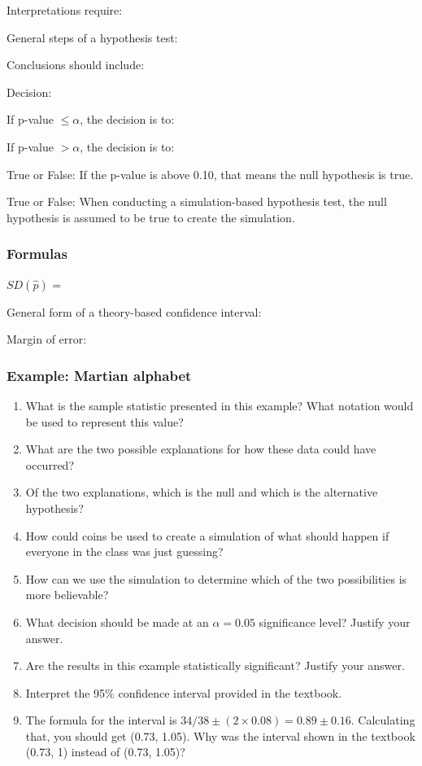 \documentclass[
]{report}
\newcommand{\rgs}{\vspace{12pt}} %
\newcommand{\rgi}{\hspace{24pt}}  %
\begin{document}
\rgi Interpretations require:
\rgs

General steps of a hypothesis test:
\rgs

Conclusions should include:
\rgs

Decision:

\rgi If p-value \(\leq \alpha\), the decision is to:

\rgi If p-value \(> \alpha\), the decision is to:

True or False: If the p-value is above 0.10, that means the null hypothesis is true.

True or False: When conducting a simulation-based hypothesis test, the null hypothesis is assumed to be true to create the simulation.

\hypertarget{formulas}{%
\subsubsection*{Formulas}\label{formulas}}

\(SD(\hat{p})\) =
\rgs

General form of a theory-based confidence interval:
\rgs

Margin of error:
\rgs

\hypertarget{example-martian-alphabet}{%
\subsubsection*{Example: Martian alphabet}\label{example-martian-alphabet}}

\begin{enumerate}
\def\labelenumi{\arabic{enumi}.}
\item
  What is the sample statistic presented in this example? What notation would be used to represent this value?
  \rgs
\item
  What are the two possible explanations for how these data could have occurred?
  \rgs
  \rgs
\item
  Of the two explanations, which is the null and which is the alternative hypothesis?
  \rgs
\item
  How could coins be used to create a simulation of what should happen if everyone in the class was just guessing?
  \rgs
  \rgs
  \rgs
\item
  How can we use the simulation to determine which of the two possibilities is more believable?
  \rgs
  \rgs
\item
  What decision should be made at an \(\alpha = 0.05\) significance level? Justify your answer.
  \rgs
\item
  Are the results in this example statistically significant? Justify your answer.
  \rgs
\item
  Interpret the 95\% confidence interval provided in the textbook.
  \rgs
  \rgs
\item
  The formula for the interval is \(34/38 \pm (2 \times 0.08) = 0.89 \pm 0.16\). Calculating that, you should get (0.73, 1.05). Why was the interval shown in the textbook (0.73, 1) instead of (0.73, 1.05)?
  \rgs
\end{enumerate}
\end{document}
